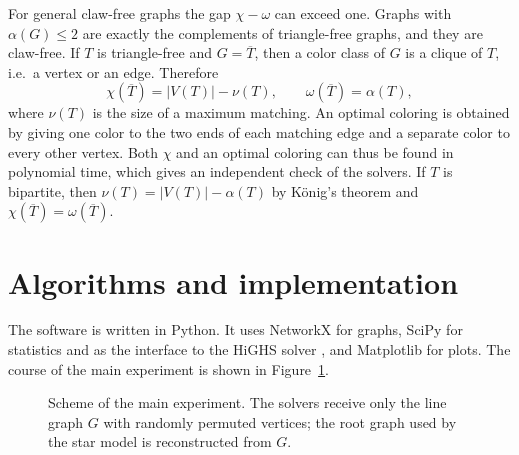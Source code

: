 \documentclass[11pt,a4paper]{article}
\newcommand{\Vedge}{\textsc{V-edge}}
\newcommand{\Vclique}{\textsc{V-clique}}
\newcommand{\Estar}{\textsc{E-star}}
\begin{document}
For general claw-free graphs the gap $\chi-\omega$ can exceed one. Graphs with
$\alpha(G)\le 2$ are exactly the complements of triangle-free graphs, and they
are claw-free. If $T$ is triangle-free and $G=\overline{T}$, then a color class
of $G$ is a clique of $T$, i.e.\ a vertex or an edge. Therefore
\begin{equation}\label{eq:matching}
\chi(\overline{T})=|V(T)|-\nu(T),\qquad \omega(\overline{T})=\alpha(T),
\end{equation}
where $\nu(T)$ is the size of a maximum matching. An optimal coloring is
obtained by giving one color to the two ends of each matching edge and a
separate color to every other vertex. Both $\chi$ and an optimal coloring can
thus be found in polynomial time, which gives an independent check of the
solvers. If $T$ is bipartite, then $\nu(T)=|V(T)|-\alpha(T)$ by K\"onig's
theorem and $\chi(\overline{T})=\omega(\overline{T})$.

\section{Algorithms and implementation}

The software is written in Python. It uses NetworkX \cite{hagberg2008} for
graphs, SciPy \cite{virtanen2020} for statistics and as the interface to the
HiGHS solver \cite{huangfu2018}, and Matplotlib for plots. The course of the
main experiment is shown in Figure~\ref{fig:scheme}.

\begin{figure}[!tb]
\centering
{}
\caption{Scheme of the main experiment. The solvers receive only the line
graph $G$ with randomly permuted vertices; the root graph used by the star
model is reconstructed from $G$.}
\label{fig:scheme}
\end{figure}
\end{document}
